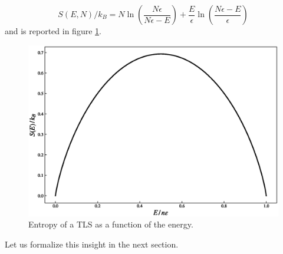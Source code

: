 \begin{equation*}
    S(E, N) / k_B = N \ln\left(\frac{N\epsilon}{N\epsilon - E}\right) + \frac{E}{\epsilon} \ln\left(\frac{N\epsilon - E}{\epsilon}\right)
\end{equation*}
and is reported in figure \ref{fig:TLS_entropy_E}. \\
\begin{figure}
    \centering 
    \includegraphics[scale=0.65]{images/entropy_TLS.eps}
    \caption{Entropy of a TLS as a function of the energy.}
    \label{fig:TLS_entropy_E}
\end{figure}
Let us formalize this insight in the next section.
